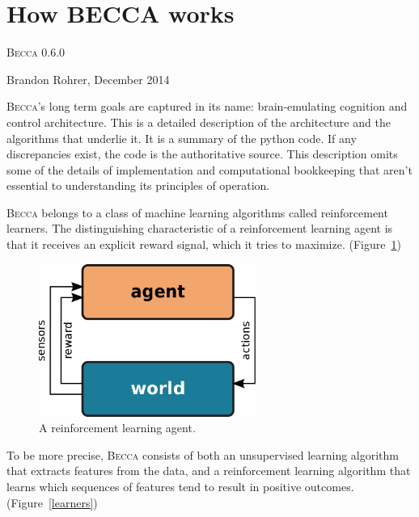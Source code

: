 \documentclass[oneside,twocolumn]{article}
\begin{document}
\addtolength{\parskip}{\baselineskip}

\section*{\color{copper} \huge How BECCA works}

\textsc{Becca} 0.6.0 

Brandon Rohrer, December 2014

\textsc{Becca}'s long term goals are captured in its name: brain-emulating cognition and control architecture. This is a detailed description of the architecture and the algorithms that underlie it. It is a summary of the python code. If any discrepancies exist, the code is the authoritative source. This description omits some of the details of implementation and computational bookkeeping that aren't essential to understanding its principles of operation.  

\textsc{Becca} belongs to a class of machine learning algorithms called reinforcement learners. The distinguishing characteristic of a reinforcement learning agent is that it receives an explicit reward signal, which it tries to maximize. (Figure~\ref{rl}) 

\begin{figure}[ht]
\centering
\includegraphics[height=5.0cm]{figs/rl.png}
\caption{A reinforcement learning agent.}
\label{rl}
\end{figure}

To be more precise, \textsc{Becca} consists of both an unsupervised learning algorithm that extracts features from the data, and a reinforcement learning algorithm that learns which sequences of features tend to result in positive outcomes. (Figure~\ref{learners})
\end{document}
